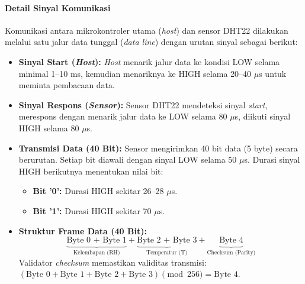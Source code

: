 \paragraph{Detail Sinyal Komunikasi}
Komunikasi antara mikrokontroler utama (\textit{host}) dan sensor DHT22 dilakukan melalui satu jalur data tunggal (\textit{data line}) dengan urutan sinyal sebagai berikut:
\begin{itemize}
	\item \textbf{Sinyal Start (\textit{Host}):} \textit{Host} menarik jalur data ke kondisi LOW selama minimal 1--10 ms, kemudian menariknya ke HIGH selama 20--40 $\mu$s untuk meminta pembacaan data.
	\item \textbf{Sinyal Respons (\textit{Sensor}):} Sensor DHT22 mendeteksi sinyal \textit{start}, merespons dengan menarik jalur data ke LOW selama 80 $\mu$s, diikuti sinyal HIGH selama 80 $\mu$s.
	\item \textbf{Transmisi Data (40 Bit):} Sensor mengirimkan 40 bit data (5 byte) secara berurutan. Setiap bit diawali dengan sinyal LOW selama 50 $\mu$s. Durasi sinyal HIGH berikutnya menentukan nilai bit:
	      \begin{itemize}
		      \item \textbf{Bit '0':} Durasi HIGH sekitar 26--28 $\mu$s.
		      \item \textbf{Bit '1':} Durasi HIGH sekitar 70 $\mu$s.
	      \end{itemize}
	\item \textbf{Struktur Frame Data (40 Bit):}
	      \[
		      \underbrace{\text{Byte 0 + Byte 1}}_{\text{Kelembapan (RH)}} + \underbrace{\text{Byte 2 + Byte 3}}_{\text{Temperatur (T)}} + \underbrace{\text{Byte 4}}_{\text{Checksum (Parity)}}
	      \]
	      Validator \textit{checksum} memastikan validitas transmisi: $(\text{Byte 0} + \text{Byte 1} + \text{Byte 2} + \text{Byte 3}) \pmod{256} = \text{Byte 4}$.
\end{itemize}


